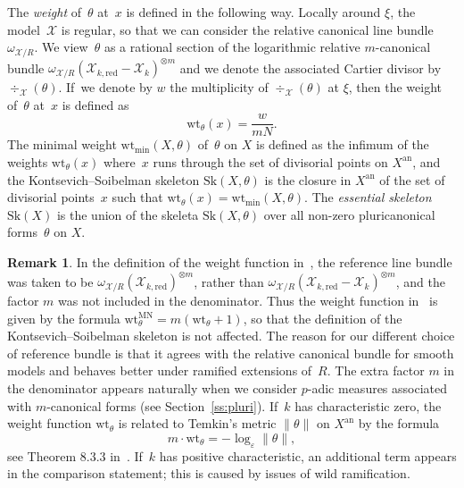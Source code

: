 \documentclass[11pt]{article}
\theoremstyle{definition}
\newtheorem{remark}[equation]{Remark}
\numberwithin{equation}{subsection}
\newcommand{\cX}{\ensuremath{\mathscr{X}}}
\newcommand{\an}{\mathrm{an}}
\newcommand{\red}{\mathrm{red}}
\newcommand{\Sk}{\mathrm{Sk}}
\newcommand{\wt}{\mathrm{wt}}
\let\form\theta
\begin{document}
The {\em weight} of~$\form$ at~$x$ is defined in the following way. Locally around $\xi$, the model~$\cX$ is regular, so that we can consider the relative canonical line bundle $\omega_{\cX/R}$. We view~$\form$ as a rational section of the logarithmic relative $m$-canonical bundle
\hbox{$\omega_{\cX/R}(\cX_{k,\red}-\cX_k)^{\otimes m}$} and we denote the associated Cartier divisor by $\div_{\cX}(\form)$. If~we denote by $w$ the multiplicity of $\div_{\cX}(\form)$ at $\xi$, then the weight of~$\form$ at~$x$ is defined as
\[
\wt_{\form}(x)=\frac{w}{mN}.
\]
The minimal weight $\wt_{\min}(X,\form)$ of~$\form$ on $X$ is defined as
the infimum of the weights $\wt_{\form}(x)$ where~$x$ runs through the set of divisorial points on $X^{\an}$, and the Kontsevich--Soibelman skeleton $\Sk(X,\form)$
is the closure in $X^{\an}$ of the set of divisorial points~$x$ such that $\wt_{\form}(x)=\wt_{\min}(X,\form)$. The {\em essential skeleton} $\Sk(X)$ is the union of the skeleta $\Sk(X,\form)$ over all non-zero
pluricanonical forms~$\form$ on $X$.

\begin{remark}\label{rema:weight}
In the definition of the weight function in~\cite{MuNi}, the reference line bundle was taken to be $\omega_{\cX/R}(\cX_{k,\red})^{\otimes m}$, rather than $\omega_{\cX/R}(\cX_{k,\red}-\cX_k)^{\otimes m}$, and the factor $m$ was not included in the denominator. Thus the weight function in~\cite{MuNi} is given by the formula $\wt^{\mathrm{MN}}_{\form}=m(\wt_{\form}+1)$, so that the definition of the Kontsevich--Soibelman skeleton is not affected. The reason for our different choice of reference bundle is that it agrees with the relative canonical bundle for smooth models and behaves better under ramified extensions of~$R$. The extra factor $m$ in the denominator appears naturally when we consider $p$-adic measures associated with $m$-canonical forms (see Section~\ref{ss:pluri}). If~$k$ has characteristic zero, the weight function $\wt_{\form}$ is related to Temkin's metric $\|\form\|$ on $X^{\an}$ by the formula
\[
m\cdot \wt_{\form}=-\log_{\varepsilon}\|\form\|,
\]
see Theorem 8.3.3 in~\cite{temkin}. If~$k$ has positive characteristic, an additional term appears in the comparison statement; this is caused by issues of wild ramification.
\end{remark}
\end{document}
